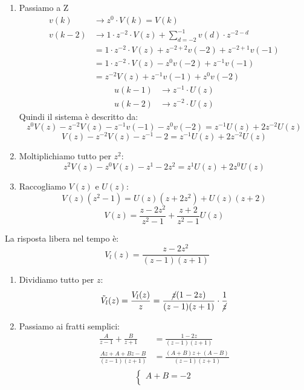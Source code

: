 \documentclass[a4paper]{article}
\begin{document}
\begin{example}
\begin{enumerate}
    \item Passiamo a Z
      \[
        \begin{aligned}
          v(k) &\to z^0 \cdot V(k) = V(k)\\
          v(k-2) &\to 1 \cdot z^{-2} \cdot V(z) + \sum_{d=-2}^{-1} v(d) \cdot z^{-2-d}\\
                 &= 1 \cdot z^{-2} \cdot V(z) + z^{-2+2} v(-2) + z^{-2+1} v(-1)\\
                 &= 1 \cdot z^{-2} \cdot V(z) - z^0 v(-2) + z^{-1} v(-1)\\
                 &= z^{-2} V(z) + z^{-1} v(-1) + z^0 v(-2)
        \end{aligned}
      \] 
      \[
        \begin{aligned}
          u(k-1) &\to z^{-1} \cdot U(z)\\
          u(k-2) &\to z^{-2} \cdot U(z)
        \end{aligned}
      \] 
      Quindi il sistema è descritto da:
      \[
        z^0 V(z) - z^{-2} V(z) - z^{-1} v(-1) - z^0 v(-2) = z^{-1} U(z) + 2z^{-2} U(z)
      \] 
      \[
        V(z) - z^{-2} V(z) - z^{-1} - 2 = z^{-1} U(z) + 2z^{-2} U(z)
      \] 
    \item Moltiplichiamo tutto per \( z^2 \):
      \[
        z^2 V(z) - z^0 V(z) - z^1 - 2z^2 = z^1 U(z) + 2z^0 U(z)
      \] 
    \item Raccogliamo \( V(z) \) e \( U(z) \):
      \[
      V(z) (z^2 - 1) = U(z) (z + 2z^2) + U(z) (z + 2)
      \] 
      \[
        V(z) = \frac{z-2z^2}{z^2-1} + \frac{z+2}{z^2-1} U(z)
      \] 
  \end{enumerate}
  La risposta libera nel tempo è:
  \[
    V_l(z) = \frac{z-2z^2}{(z-1)(z+1)}
  \] 
  \begin{enumerate}
    \item  Dividiamo tutto per \( z \):
      \[
        \tilde{V}_l(z) = \frac{V_l(z)}{z} = \frac{\cancel{z}(1-2z)}{(z-1)(z+1)} \cdot
        \frac{1}{\cancel{z}}
      \] 
    \item Passiamo ai fratti semplici:
      \[
        \begin{aligned}
          \frac{A}{z-1} + \frac{B}{z+1} &= \frac{1-2z}{(z-1)(z+1)}\\
          \frac{Az + A + Bz - B}{(z-1)(z+1)} &= \frac{(A+B)z + (A-B)}{(z-1)(z+1)}\\
        \end{aligned}
      \] 
      \[
      \begin{cases}
        A+B = -2\\

\end{cases}\]
\end{enumerate}
\end{example}
\end{document}
